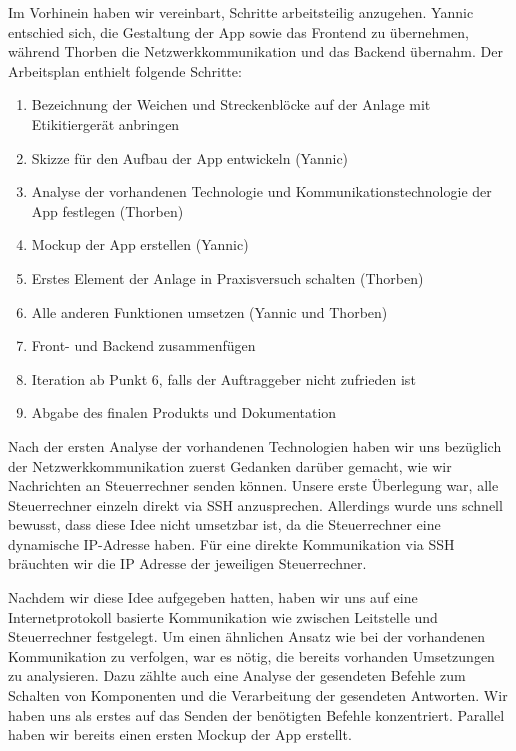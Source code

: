 \documentclass{article}
\begin{document}
Im Vorhinein haben wir vereinbart, Schritte arbeitsteilig anzugehen.
Yannic entschied sich, die Gestaltung der App sowie das Frontend zu übernehmen, während Thorben die Netzwerkkommunikation und das Backend übernahm.
Der Arbeitsplan enthielt folgende Schritte:
\begin{enumerate}
    \item Bezeichnung der Weichen und Streckenblöcke auf der Anlage mit Etikitiergerät anbringen
    \item Skizze für den Aufbau der App entwickeln (Yannic)
    \item Analyse der vorhandenen Technologie und Kommunikationstechnologie der App festlegen (Thorben)
    \item Mockup der App erstellen (Yannic)
    \item Erstes Element der Anlage in Praxisversuch schalten (Thorben)
    \item Alle anderen Funktionen umsetzen (Yannic und Thorben)
    \item Front- und Backend zusammenfügen
    \item Iteration ab Punkt 6, falls der Auftraggeber nicht zufrieden ist
    \item Abgabe des finalen Produkts und Dokumentation
\end{enumerate}

Nach der ersten Analyse der vorhandenen Technologien haben wir uns bezüglich der Netzwerkkommunikation zuerst Gedanken darüber gemacht, wie wir Nachrichten an Steuerrechner senden können.
Unsere erste Überlegung war, alle Steuerrechner einzeln direkt via SSH anzusprechen.
Allerdings wurde uns schnell bewusst, dass diese Idee nicht umsetzbar ist, da die Steuerrechner eine dynamische IP-Adresse haben.
Für eine direkte Kommunikation via SSH bräuchten wir die IP Adresse der jeweiligen Steuerrechner.

Nachdem wir diese Idee aufgegeben hatten, haben wir uns auf eine Internetprotokoll basierte Kommunikation wie zwischen Leitstelle und Steuerrechner festgelegt.
Um einen ähnlichen Ansatz wie bei der vorhandenen Kommunikation zu verfolgen, war es nötig, die bereits vorhanden Umsetzungen zu analysieren.
Dazu zählte auch eine Analyse der gesendeten Befehle zum Schalten von Komponenten und die Verarbeitung der gesendeten Antworten.
Wir haben uns als erstes auf das Senden der benötigten Befehle konzentriert.
Parallel haben wir bereits einen ersten Mockup der App erstellt.
\end{document}
